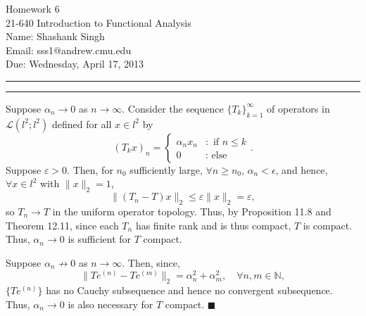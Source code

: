 \documentclass[11pt]{article}
\makeatletter
\newcounter{questionCounter}
\newcounter{partCounter}[questionCounter]
\newenvironment{question}[2][\arabic{questionCounter}]{%
    \setcounter{partCounter}{0}%
    \vspace{.25in} \hrule \vspace{0.5em}%
        \noindent{\bf #2}%
    \vspace{0.8em} \hrule \vspace{.10in}%
    \addtocounter{questionCounter}{1}%
}{}
\newcommand{\myname}{Shashank Singh}
\newcommand{\myandrew}{sss1@andrew.cmu.edu}
\newcommand{\myclass}{21-640 Introduction to Functional Analysis}
\newcommand{\myhwnum}{6}
\newcommand{\duedate}{Wednesday, April 17, 2013}
\renewcommand{\qed}{\quad $\blacksquare$}
\newcommand{\N}{\mathbb{N}} %
\renewcommand{\L}{\mathcal{L}} %
\newcommand{\e}{\varepsilon} %
\makeatother
\begin{document}
\thispagestyle{plain}

{\Large Homework \myhwnum} \\
\myclass \\
Name: \myname \\
Email: \myandrew \\
Due: \duedate

\begin{question}{Problem 1}
Suppose $\alpha_n \to 0$ as $n \to \infty$. Consider the sequence
$\{T_k\}_{k = 1}^\infty$ of operators in $\L(l^2;l^2)$ defined for all
$x \in l^2$ by
\[(T_kx)_n
    = \left\{
        \begin{array}{cl}
            \alpha_nx_n &   : \mbox{ if } n \leq k    \\
            0           &   : \mbox{ else }
        \end{array}
    \right..
\]
Suppose $\e > 0$. Then, for $n_0$ sufficiently large, $\forall n \geq n_0$,
$\alpha_n < \epsilon$, and hence, $\forall x \in l^2$ with $\|x\|_2 = 1$,
\[\|(T_n - T)x\|_2 \leq \e\|x\|_2 = \e,\]
so $T_n \to T$ in the uniform operator topology. Thus, by Proposition 11.8
and Theorem 12.11, since each $T_n$ has finite rank and is thus compact, $T$ is
compact. Thus, $\alpha_n \to 0$ is sufficient for $T$ compact.

Suppose $\alpha_n \not\to 0$ as $n \to \infty$. Then, since,
\[\|Te^{(n)} - Te^{(m)}\|_2 = \alpha_n^2 + \alpha_m^2,
    \quad \forall n,m \in \N,\]
$\{Te^{(n)}\}$ has no Cauchy subsequence and hence no convergent subsequence.
Thus, $\alpha_n \to 0$ is also necessary for $T$ compact. \qed
\end{question}
\end{document}
